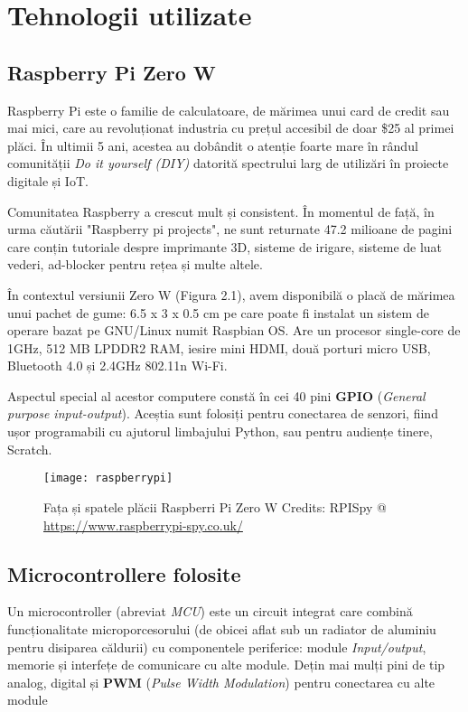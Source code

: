 \chapter{Tehnologii utilizate}


\section{Raspberry Pi Zero W}

Raspberry Pi este o familie de calculatoare, de mărimea unui card de credit sau mai mici, care au revoluționat industria cu prețul accesibil de doar \$25 al primei plăci. În ultimii 5 ani, acestea au dobândit o atenție foarte mare în rândul comunității \emph{Do it yourself (DIY)} datorită spectrului larg de utilizări în proiecte digitale și IoT.

Comunitatea Raspberry a crescut mult și consistent. În momentul de față, în urma căutării "Raspberry pi projects", ne sunt returnate 47.2 milioane de pagini care conțin tutoriale despre imprimante 3D, sisteme de irigare, sisteme de luat vederi, ad-blocker pentru rețea și multe altele.

În contextul versiunii Zero W (Figura 2.1), avem disponibilă o placă de mărimea unui pachet de gume: 6.5 x 3 x 0.5 cm pe care poate fi instalat un sistem de operare bazat pe GNU/Linux numit Raspbian OS. Are un procesor single-core de 1GHz, 512 MB LPDDR2 RAM, iesire mini HDMI, două porturi micro USB, Bluetooth 4.0 și 2.4GHz 802.11n Wi-Fi.

Aspectul special al acestor computere constă în cei 40 pini \textbf{GPIO} (\emph{General purpose input-output}). Aceștia sunt folosiți pentru conectarea de senzori, fiind ușor programabili cu ajutorul limbajului Python, sau pentru audiențe tinere, Scratch.


\begin{figure}[h]
	\centering
	\texttt{[image: raspberrypi]}
	\caption{Fața și spatele plăcii Raspberri Pi Zero W
		Credits: RPISpy @ \url{https://www.raspberrypi-spy.co.uk/}}
	\label{fig:raspberrypi}
\end{figure}

\break

\section{Microcontrollere folosite}

Un microcontroller (abreviat \emph{MCU}) este un circuit integrat care combină funcționalitate microporcesorului (de obicei aflat sub un radiator de aluminiu pentru disiparea căldurii) cu componentele periferice: module \emph{Input/output}, memorie și interfețe de comunicare cu alte module. Dețin mai mulți pini de tip analog, digital și \textbf{PWM} (\emph{Pulse Width Modulation}) pentru conectarea cu alte module

